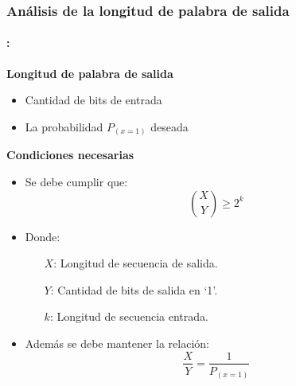 \begin{frame}
  \frametitle{\textbf{Análisis de la longitud de palabra de salida}}
    \framesubtitle{\secname : \subsecname}
   \begin{block}{\centering \textbf{Longitud de palabra de salida}}
        \begin{itemize}\footnotesize
            \item  Cantidad de bits de entrada
            \item La probabilidad $P_{(x=1)}$ deseada
        \end{itemize}
    \end{block}
    \vspace{-0.2cm}

    \begin{block}{\centering \textbf{Condiciones necesarias}}
        \begin{itemize}\footnotesize
            \item Se debe cumplir que:
            \begin{equation*}
            {X \choose Y} \geq 2^{k}    
            \end{equation*}
        \item Donde:
            \begin{itemize}\footnotesize
                \item [$X$:] Longitud de secuencia de salida.
                \item [$Y$:] Cantidad de bits de salida en `1'.
                \item [$k$:] Longitud de secuencia entrada. 
            \end{itemize}
        \item Además se debe mantener la relación:
            \begin{equation*}
            \frac{X}{Y} =  \frac{1}{P_{(x=1)}}  
            \end{equation*}
        \end{itemize}
    \end{block}

\end{frame}

